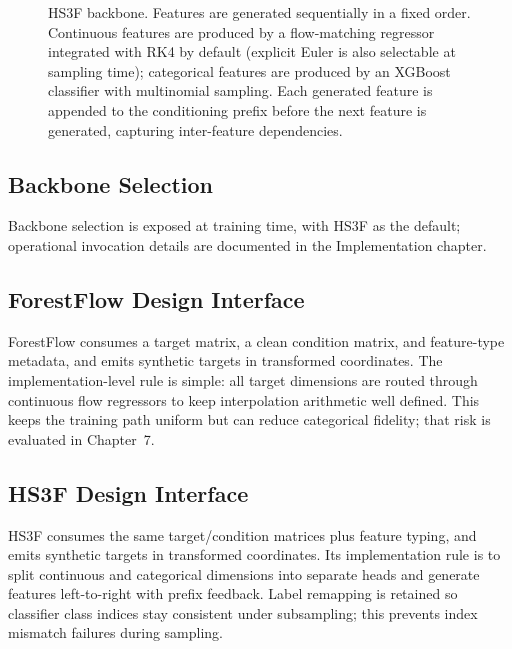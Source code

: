 \begin{figure}[htbp]
\caption{HS3F backbone. Features are generated sequentially in a fixed order. Continuous features are produced by a flow-matching regressor integrated with RK4 by default (explicit Euler is also selectable at sampling time); categorical features are produced by an XGBoost classifier with multinomial sampling. Each generated feature is appended to the conditioning prefix before the next feature is generated, capturing inter-feature dependencies.}
\label{fig:hs3f-arch}
\end{figure}

\subsection{Backbone Selection}

Backbone selection is exposed at training time, with HS3F as the default; operational invocation details are documented in the Implementation chapter.

\subsection{ForestFlow Design Interface}

ForestFlow consumes a target matrix, a clean condition matrix, and feature-type metadata, and emits synthetic targets in transformed coordinates.
The implementation-level rule is simple: all target dimensions are routed through continuous flow regressors to keep interpolation arithmetic well defined.
This keeps the training path uniform but can reduce categorical fidelity; that risk is evaluated in Chapter~7.

\subsection{HS3F Design Interface}

HS3F consumes the same target/condition matrices plus feature typing, and emits synthetic targets in transformed coordinates.
Its implementation rule is to split continuous and categorical dimensions into separate heads and generate features left-to-right with prefix feedback.
Label remapping is retained so classifier class indices stay consistent under subsampling; this prevents index mismatch failures during sampling.

